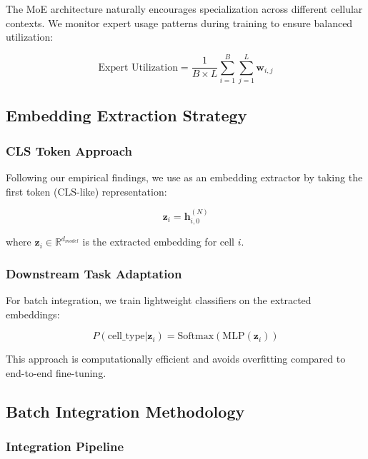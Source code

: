 The MoE architecture naturally encourages specialization across different cellular contexts. We monitor expert usage patterns during training to ensure balanced utilization:

\begin{equation}
\text{Expert Utilization} = \frac{1}{B \times L} \sum_{i=1}^{B} \sum_{j=1}^{L} \mathbf{w}_{i,j}
\end{equation}

\subsection{Embedding Extraction Strategy}

\subsubsection{CLS Token Approach}

Following our empirical findings, we use \bioformer{} as an embedding extractor by taking the first token (CLS-like) representation:

\begin{equation}
\mathbf{z}_i = \mathbf{h}_{i,0}^{(N)}
\end{equation}

where $\mathbf{z}_i \in \mathbb{R}^{d_{model}}$ is the extracted embedding for cell $i$.

\subsubsection{Downstream Task Adaptation}

For batch integration, we train lightweight classifiers on the extracted embeddings:

\begin{equation}
P(\text{cell\_type} | \mathbf{z}_i) = \text{Softmax}(\text{MLP}(\mathbf{z}_i))
\end{equation}

This approach is computationally efficient and avoids overfitting compared to end-to-end fine-tuning.

\subsection{Batch Integration Methodology}

\subsubsection{Integration Pipeline}

